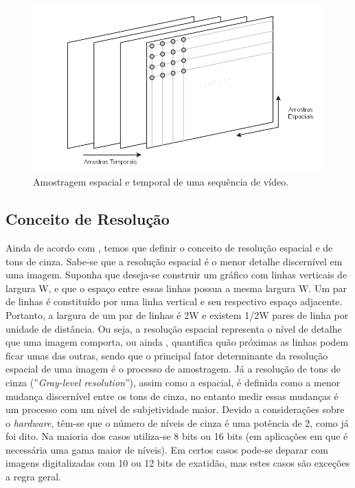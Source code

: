 \begin{figure}[h]
	\centering
	\includegraphics[scale=0.65]{figuras/AMOSTRAGEM_VIDEO.png}
	\caption{Amostragem espacial e temporal de uma sequência de vídeo.}
	\label{AMOSTRAGEM_VIDEO}
\end{figure}

\subsection{Conceito de Resolução} \label{resolucao}

Ainda de acordo com , temos que definir o conceito de resolução espacial e de tons de cinza. Sabe-se que a resolução espacial é o menor detalhe discernível em uma imagem. Suponha que deseja-se construir um gráfico com linhas verticais de largura W, e que o espaço entre essas linhas possua a mesma largura W. Um par de linhas é constituído por uma linha vertical e seu respectivo espaço adjacente. Portanto, a largura de um par de linhas é 2W e existem 1/2W pares de linha por unidade de distância. Ou seja, a resolução espacial representa o nível de detalhe que uma imagem comporta, ou ainda , quantifica quão próximas as linhas podem ficar umas das outras, sendo que o principal fator determinante da resolução espacial de uma imagem é o processo de amostragem. Já a resolução de tons de cinza (''\textit{Gray-level resolution}''), assim como a espacial, é definida como a menor mudança discernível entre os tons de cinza, no entanto medir essas mudanças é um processo com um nível de subjetividade maior. Devido a considerações sobre o \textit{hardware}, têm-se que o número de níveis de cinza é uma potência de 2, como já foi dito. Na maioria dos casos utiliza-se 8 bits ou 16 bits (em aplicações em que é necessária uma gama maior de níveis). Em certos casos pode-se deparar com imagens digitalizadas com 10 ou 12 bits de exatidão, mas estes casos são exceções a regra geral.    

